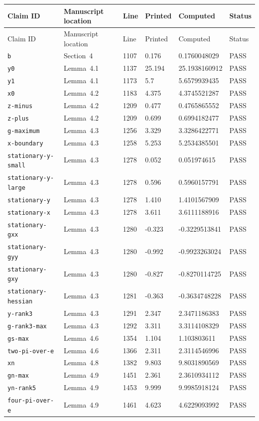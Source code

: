 {\footnotesize
\setlength{\tabcolsep}{2pt}
\begin{longtable}{@{}p{36mm}p{39mm}p{9mm}p{14mm}p{27mm}p{12mm}@{}}
\toprule
Claim ID & Manuscript location & Line & Printed & Computed & Status \\
\midrule\endfirsthead
\toprule
Claim ID & Manuscript location & Line & Printed & Computed & Status \\
\midrule\endhead
\bottomrule\endfoot
\nolinkurl{b} & Section~4 & 1107 & 0.176 & 0.1760048029 & PASS \\
\nolinkurl{y0} & Lemma~4.1 & 1137 & 25.194 & 25.1938160912 & PASS \\
\nolinkurl{y1} & Lemma~4.1 & 1173 & 5.7 & 5.6579939435 & PASS \\
\nolinkurl{x0} & Lemma~4.2 & 1183 & 4.375 & 4.3745521287 & PASS \\
\nolinkurl{z-minus} & Lemma~4.2 & 1209 & 0.477 & 0.4765865552 & PASS \\
\nolinkurl{z-plus} & Lemma~4.2 & 1209 & 0.699 & 0.6994182477 & PASS \\
\nolinkurl{g-maximum} & Lemma~4.3 & 1256 & 3.329 & 3.3286422771 & PASS \\
\nolinkurl{x-boundary} & Lemma~4.3 & 1258 & 5.253 & 5.2534385501 & PASS \\
\nolinkurl{stationary-y-small} & Lemma~4.3 & 1278 & 0.052 & 0.051974615 & PASS \\
\nolinkurl{stationary-y-large} & Lemma~4.3 & 1278 & 0.596 & 0.5960157791 & PASS \\
\nolinkurl{stationary-y} & Lemma~4.3 & 1278 & 1.410 & 1.4101567909 & PASS \\
\nolinkurl{stationary-x} & Lemma~4.3 & 1278 & 3.611 & 3.6111188916 & PASS \\
\nolinkurl{stationary-gxx} & Lemma~4.3 & 1280 & -0.323 & -0.3229513841 & PASS \\
\nolinkurl{stationary-gyy} & Lemma~4.3 & 1280 & -0.992 & -0.9923263024 & PASS \\
\nolinkurl{stationary-gxy} & Lemma~4.3 & 1280 & -0.827 & -0.8270114725 & PASS \\
\nolinkurl{stationary-hessian} & Lemma~4.3 & 1281 & -0.363 & -0.3634748228 & PASS \\
\nolinkurl{y-rank3} & Lemma~4.3 & 1291 & 2.347 & 2.3471186383 & PASS \\
\nolinkurl{g-rank3-max} & Lemma~4.3 & 1292 & 3.311 & 3.3114108329 & PASS \\
\nolinkurl{gs-max} & Lemma~4.6 & 1354 & 1.104 & 1.103803611 & PASS \\
\nolinkurl{two-pi-over-e} & Lemma~4.6 & 1366 & 2.311 & 2.3114546996 & PASS \\
\nolinkurl{xn} & Lemma~4.8 & 1382 & 9.803 & 9.8031890569 & PASS \\
\nolinkurl{gn-max} & Lemma~4.9 & 1451 & 2.361 & 2.3610934112 & PASS \\
\nolinkurl{yn-rank5} & Lemma~4.9 & 1453 & 9.999 & 9.9985918124 & PASS \\
\nolinkurl{four-pi-over-e} & Lemma~4.9 & 1461 & 4.623 & 4.6229093992 & PASS \\
\end{longtable}
}
